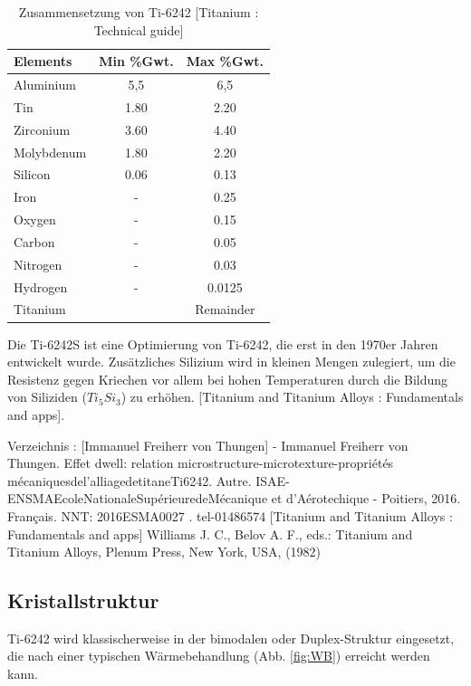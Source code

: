 \begin{table}[H]
	
	\centering	
	\begin{tabular}{|l |c |c|}
		\hline
		\centering
		\hspace{20ex}Elements \hspace{20ex} & Min \%Gwt. & Max \%Gwt.\\
		\hline
		Aluminium&5,5&6,5\\
		Tin&1.80&2.20\\
		Zirconium&3.60&4.40\\
		Molybdenum&1.80&2.20\\
		Silicon &0.06&0.13\\
		Iron&-&0.25\\
		Oxygen&-&0.15\\
		Carbon&	-&	0.05\\
		Nitrogen&-&0.03\\
		Hydrogen&-&0.0125\\
		
		Titanium &&Remainder\\
		\hline
	\end{tabular}
	\caption{Zusammensetzung von Ti-6242 [Titanium : Technical guide]}
	\label{tab:Zusammensetzung}
\end{table}


Die Ti-6242S ist eine Optimierung von Ti-6242, die erst in den 1970er Jahren  entwickelt wurde. Zusätzliches Silizium wird in kleinen Mengen zulegiert, um die Resistenz gegen Kriechen vor allem bei hohen Temperaturen durch die Bildung von Siliziden ($Ti_5Si_3$) zu erhöhen.  [Titanium and Titanium Alloys : Fundamentals and apps]. 

Verzeichnis : [Immanuel Freiherr von Thungen] - Immanuel Freiherr von Thungen. Effet dwell: relation microstructure-microtexture-propriétés mécaniquesdel’alliagedetitaneTi6242. Autre. ISAE-ENSMAEcoleNationaleSupérieuredeMécanique et d’Aérotechique - Poitiers, 2016. Français. NNT: 2016ESMA0027 .  tel-01486574
[Titanium and Titanium Alloys : Fundamentals and apps] Williams J. C., Belov A. F., eds.: Titanium and Titanium Alloys, Plenum Press, New York, USA, (1982) 


\subsection{Kristallstruktur}

Ti-6242 wird klassischerweise in der bimodalen oder Duplex-Struktur eingesetzt, die nach einer typischen Wärmebehandlung (Abb. \ref{fig:WB}) erreicht werden kann.

